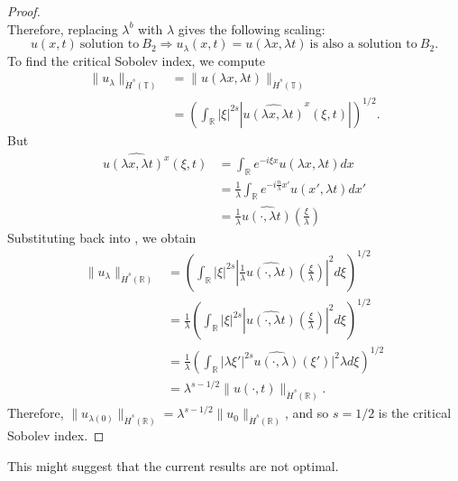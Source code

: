 \documentclass[12pt,reqno]{amsart}
\numberwithin{equation}{section}  %
\renewcommand{\cref}{\Cref}
\newcommand{\rr}{\mathbb{R}}
\newcommand{\ci}{\mathbb{T}}
\newcommand{\wh}{\widehat}
\begin{document}
\begin{appendices}
\begin{itemize}
\begin{proof}
\[\]
%
%
Therefore, replacing  $ \lambda^b$ with  $ \lambda$ gives the following scaling:
%
\begin{equation}
\label{B2-scal}
\boxed{u(x, t) \ \text{solution to} \  B_2
 \Longrightarrow 
u_\lambda (x, t) = u(\lambda x, \lambda t) \ \text{is also a
solution to} \  B_2. 
}
\end{equation}
\label{rem:scaling-B2}
To find the critical Sobolev index, we compute
%
%
\begin{equation}
\begin{split}
  \| u_{\lambda} \|_{\dot{H}^s(\ci)} 
  & =  \| u(\lambda x, \lambda t) \|_{\dot{H}^{s}(\ci)}
  \\
  & = \left( \int_{\rr} | \xi |^{2s} | \wh{u(\lambda x,
  \lambda t)}^x (\xi, t)| \right)^{1/2}.
\end{split}
\label{crit-ind-comp-B2}
\end{equation}
%
But
%
%
\begin{equation*}
\begin{split}
  \wh{u(\lambda x, \lambda t)^x}(\xi, t)
  & = \int_{\rr}e^{-i\xi x}u(\lambda x, \lambda t) dx
  \\
  & = \frac{1}{\lambda} \int_{\rr}e^{-i \frac{n}{\lambda} x'}u(x',
  \lambda t) dx'
  \\
  & = \frac{1}{\lambda} \wh{u(\cdot, \lambda t)}(\frac{\xi}{\lambda})
\end{split}
\end{equation*}
%
%
Substituting back into \cref{crit-ind-comp-B2}, we obtain
%
%
\begin{equation*}
\begin{split}
  \| u_{\lambda} \|_{\dot{H}^s(\rr)} 
  & = \left( \int_{\rr} | \xi |^{2s} |
  \frac{1}{\lambda}\wh{u(\cdot, \lambda t)}(\frac{\xi}{\lambda}) |^2 d \xi
  \right)^{1/2}
  \\
  & = \frac{1}{\lambda} \left( \int_{\rr}| \xi |^{2s} | \wh{u(\cdot,
  \lambda t)}(\frac{\xi}{\lambda}) |^2 d \xi  \right)^{1/2}
  \\
  & = \frac{1}{\lambda} \left( \int_{\rr} | \lambda \xi' |^{2s} 
  \wh{u(\cdot, \lambda)}(\xi') |^2 \lambda d \xi
  \right)^{1/2}
  \\
  & = \lambda^{s - 1/2} \|u(\cdot, t) \|_{\dot{H}^s (\rr)}.
\end{split}
\end{equation*}
%
%
Therefore, $\| u_{\lambda(0)} \|_{\dot{H}^s(\rr)} = \lambda^{s - 1/2} \|
u_{0} \|_{\dot{H}^{s}(\rr)}$, and so $s=1/2$ is the critical Sobolev index.
\end{proof}
\end{itemize}
This might suggest that the current results are not optimal.
\end{appendices}
\end{document}

